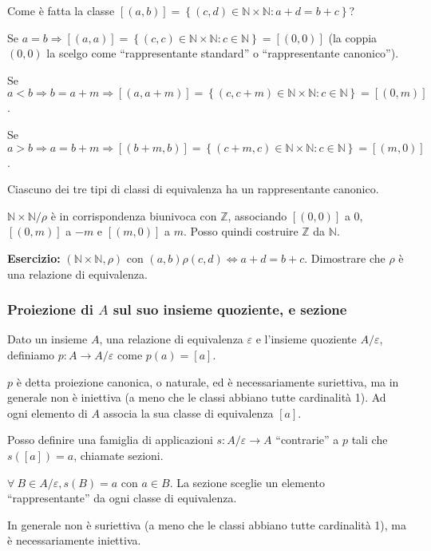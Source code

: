 Come \`e fatta la classe $[(a,b)] = \left \{ (c,d) \in \mathbb{N} \times \mathbb{N} : a + d = b + c \right\}$?

Se $a = b \Rightarrow [(a,a)] = \left \{ (c,c) \in \mathbb{N} \times \mathbb{N} : c \in \mathbb{N} \right\} = [(0,0)]$ (la coppia $(0,0)$ la scelgo come ``rappresentante standard'' o ``rappresentante canonico'').

Se $a < b \Rightarrow b = a + m \Rightarrow [(a,a+m)] = \left \{ (c, c + m) \in \mathbb{N} \times \mathbb{N} : c \in \mathbb{N}\right\} = [(0,m)]$.

Se $a > b \Rightarrow a = b + m \Rightarrow [(b + m, b)] = \left \{ (c + m, c) \in \mathbb{N} \times \mathbb{N} : c \in \mathbb{N}\right\} = [(m,0)]$.

Ciascuno dei tre tipi di classi di equivalenza ha un rappresentante canonico.

$\mathbb{N} \times \mathbb{N} / \rho$ \`e in corrispondenza biunivoca con $\mathbb{Z}$, associando $[(0,0)]$ a 0, $[(0,m)]$ a $-m$ e $[(m,0)]$ a $m$. Posso quindi costruire $\mathbb{Z}$ da $\mathbb{N}$.

\textbf{Esercizio:} $(\mathbb{N} \times \mathbb{N}, \rho)$ con $(a,b) \rho (c,d) \Leftrightarrow a + d = b + c$. Dimostrare che $\rho$ \`e una relazione di equivalenza.

\vspace{5cm}

\subsubsection{Proiezione di $A$ sul suo insieme quoziente, e sezione}

\begin{defn}[Proiezione]
Dato un insieme $A$, una relazione di equivalenza $\varepsilon$ e l'insieme quoziente $A / \varepsilon$, definiamo $p : A \to A / \varepsilon $ come $ p(a) = [a]$.
\end{defn}
$p$ \`e detta proiezione canonica, o naturale, ed \`e necessariamente suriettiva, ma in generale non \`e iniettiva (a meno che le classi abbiano tutte cardinalit\`a 1). Ad ogni elemento di $A$ associa la sua classe di equivalenza $[a]$.

Posso definire una famiglia di applicazioni $s : A / \varepsilon \to A $ ``contrarie'' a $p$ tali che $s([a]) = a$, chiamate sezioni.
\begin{defn}[Sezione]
$\forall \ B \in A / \varepsilon , s(B) = a$ con $a \in B$. La sezione sceglie un elemento ``rappresentante'' da ogni classe di equivalenza. 
\end{defn}
In generale non \`e suriettiva (a meno che le classi abbiano tutte cardinalit\`a 1), ma \`e necessariamente iniettiva.

